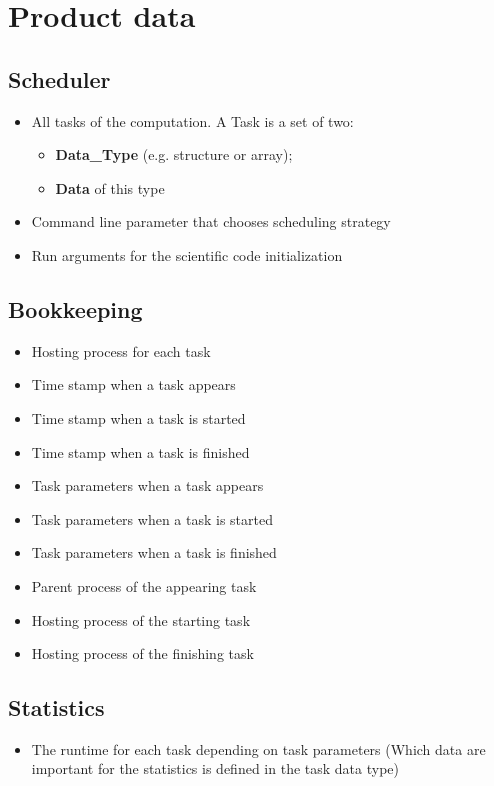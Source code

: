{


\setcounter{funcD}{10}
\renewcommand{\labelitemi}{
	\ifnum \value{funcD}<10$/D 0\arabic{funcD} /$\addtocounter{funcD}{10}
	\else $/D \arabic{funcD} /$\addtocounter{funcD}{10}\fi
	}
\section{Product data}

	\subsection{Scheduler}
		\begin{itemize}
			\item All tasks of the computation. A Task is a set of two:
				\begin{itemize}
					\item \textbf{Data\_Type} (e.g. structure or array);
					\item \textbf{Data} of this type
				\end{itemize}
			\item Command line parameter that chooses scheduling strategy
			\item Run arguments for the scientific code initialization
		\end{itemize}


	\subsection{Bookkeeping}
		\begin{itemize}
			\item Hosting process for each task
			\item Time stamp when a task appears
			\item Time stamp when a task is started
			\item Time stamp when a task is finished
			\item Task parameters when a task appears
			\item Task parameters when a task is started
			\item Task parameters when a task is finished
			\item Parent process of the appearing task
			\item Hosting process of the starting task
			\item Hosting process of the finishing task
		\end{itemize}
			
			
	\subsection{Statistics}
		\begin{itemize}
			\item The runtime for each task depending on task parameters (Which data are important for the statistics is defined in the task data type)
		\end{itemize}
}